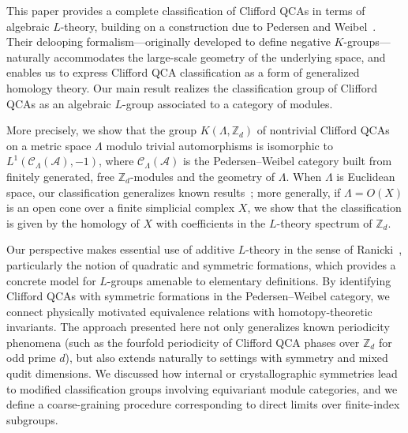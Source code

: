 \documentclass{article}
\theoremstyle{definition}
\begin{document}
This paper provides a complete classification of Clifford QCAs in terms of algebraic \(L\)-theory, building on a construction due to Pedersen and Weibel~\cite{pedersen2006nonconnective, pedersen1989k, pedersen1982ki}. Their delooping formalism—originally developed to define negative \(K\)-groups—naturally accommodates the large-scale geometry of the underlying space, and enables us to express Clifford QCA classification as a form of generalized homology theory. Our main result realizes the classification group of Clifford QCAs as an algebraic \(L\)-group associated to a category of modules.

More precisely, we show that the group \(K(\Lambda, \mathbb{Z}_d)\) of nontrivial Clifford QCAs on a metric space \(\Lambda\) modulo trivial automorphisms is isomorphic to \(L^1(\mathcal{C}_\Lambda(\mathcal{A}), -1)\), where \(\mathcal{C}_\Lambda(\mathcal{A})\) is the Pedersen–Weibel category built from finitely generated, free \(\mathbb{Z}_d\)-modules and the geometry of \(\Lambda\). When \(\Lambda\) is Euclidean space, our classification generalizes known results~\cite{haah2023nontrivial,haah2025topological}; more generally, if \(\Lambda = O(X)\) is an open cone over a finite simplicial complex \(X\), we show that the classification is given by the homology of \(X\) with coefficients in the \(L\)-theory spectrum of \(\mathbb{Z}_d\).

Our perspective makes essential use of additive \(L\)-theory in the sense of Ranicki~\cite{ranicki1973algebraic,ranicki1973algebraicII,ranicki1989additive,ranicki1992lower,ranicki1992algebraic}, particularly the notion of quadratic and symmetric formations, which provides a concrete model for \(L\)-groups amenable to elementary definitions. By identifying Clifford QCAs with symmetric formations in the Pedersen–Weibel category, we connect physically motivated equivalence relations with homotopy-theoretic invariants. The approach presented here not only generalizes known periodicity phenomena (such as the fourfold periodicity of Clifford QCA phases over \(\mathbb{Z}_d\) for odd prime \(d\)), but also extends naturally to settings with symmetry and mixed qudit dimensions. We discussed how internal or crystallographic symmetries lead to modified classification groups involving equivariant module categories, and we define a coarse-graining procedure corresponding to direct limits over finite-index subgroups. %
\end{document}
